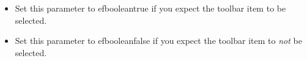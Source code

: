 
\begin{itemize}
\item Set this parameter to \jb{}efbooleantrue{} if you expect the toolbar item to be  selected.
\item Set this parameter to \jb{}efbooleanfalse{} if you expect the toolbar item to \emph{not} be selected.
\end{itemize}

